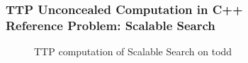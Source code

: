 \begin{frame}
    \frametitle{TTP Unconcealed Computation in C++\\
    Reference Problem: Scalable Search}
    \begin{figure}
        \caption{TTP computation of Scalable Search on todd}
        \label{fig:ttpfull}
    \end{figure}

\end{frame}